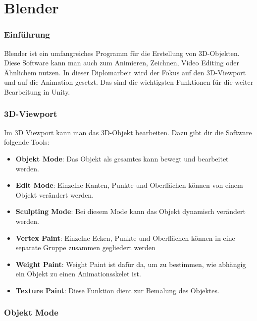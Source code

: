 \pagebreak
{}
\chapter{Blender}

\subsection{Einführung}
Blender ist ein umfangreiches Programm für die Erstellung von 3D-Objekten. Diese Software kann man auch zum Animieren, Zeichnen, Video Editing oder Ähnlichem nutzen. 
In dieser Diplomarbeit wird der Fokus auf den 3D-Viewport und auf die Animation gesetzt. Das sind die wichtigsten Funktionen für die weiter Bearbeitung in Unity. 

\subsection{3D-Viewport}
Im 3D Viewport kann man das 3D-Objekt bearbeiten. Dazu gibt dir die Software folgende Tools: 

\begin{itemize}
    \item \textbf{Objekt Mode}:
    \indent Das Objekt als gesamtes kann bewegt und bearbeitet werden. 
    \item \textbf{Edit Mode}:
    \indent Einzelne Kanten, Punkte und Oberflächen können von einem Objekt verändert werden. 
    \item \textbf{Sculpting Mode}:
    \indent Bei diesem Mode kann das Objekt dynamisch verändert werden.
    \item \textbf{Vertex Paint}:
    \indent Einzelne Ecken, Punkte und Oberflächen können in eine separate Gruppe zusammen gegliedert werden
    \item \textbf{Weight Paint}: 
    \indent Weight Paint ist dafür da, um zu bestimmen, wie abhängig ein Objekt zu einen Animationsskelet ist. 
    \item \textbf{Texture Paint}:
    \indent Diese Funktion dient zur Bemalung des Objektes.
\end{itemize}

\pagebreak

\subsection{Objekt Mode}

